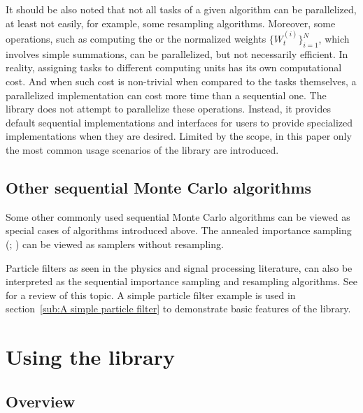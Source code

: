 \documentclass[11pt, bib, hyper, mint, minted=cache]{marticle}
\begin{document}
It should be also noted that not all tasks of a given \smc algorithm can be
parallelized, at least not easily, for example, some resampling algorithms.
Moreover, some operations, such as computing the \ess or the normalized
weights $\{W_t^{(i)}\}_{i=1}^N$, which involves simple summations, can be
parallelized, but not necessarily efficient. In reality, assigning tasks to
different computing units has its own computational cost. And when such cost
is non-trivial when compared to the tasks themselves, a parallelized
implementation can cost more time than a sequential one. The \vsmc library
does not attempt to parallelize these operations. Instead, it provides default
sequential implementations and interfaces for users to provide specialized
implementations when they are desired. Limited by the scope, in this paper
only the most common usage scenarios of the library are introduced.

\subsection{Other sequential Monte Carlo algorithms}
\label{sub:Other sequential Monte Carlo algorithms}

Some other commonly used sequential Monte Carlo algorithms can be viewed as
special cases of algorithms introduced above. The annealed importance sampling
(\ais; \textcite{Neal:2001we}) can be viewed as \smc samplers without
resampling.

Particle filters as seen in the physics and signal processing literature, can
also be interpreted as the sequential importance sampling and resampling
algorithms. See \textcite{Doucet:2011us} for a review of this topic. A simple
particle filter example is used in section~\ref{sub:A simple particle filter}
to demonstrate basic features of the \vsmc library.

\section[Using the vSMC library]{Using the \protect\vsmc library}
\label{sec:Using the vSMC library}

\subsection{Overview}
\end{document}
